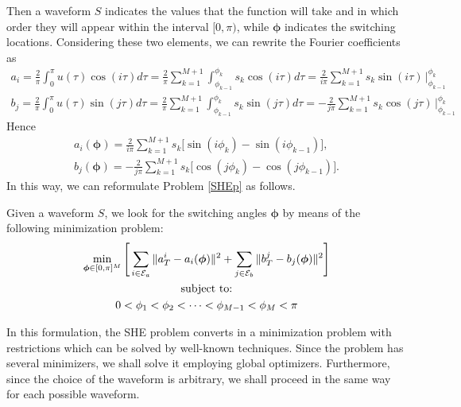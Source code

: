 Then a waveform $S$ indicates the values that the function will take and in which order they will appear within the interval $[0,\pi) $, while $\bm{\phi}$ indicates the switching locations. Considering these two elements, we can rewrite the Fourier coefficients as
\begin{gather}
    a_i = \frac{2}{\pi} \int_0^\pi u(\tau) \cos(i \tau)d\tau  = \frac{2}{\pi} \sum_{k=1}^{M+1} 
    \int_{\phi_{k-1}}^{\phi_{k}} s_k \cos(i\tau)d\tau = \frac{2}{i\pi} \sum_{k=1}^{M+1} s_k \sin(i\tau)\,\Big|_{\phi_{k-1}}^{\phi_k} 
\end{gather}
\begin{gather}
    b_j = \frac{2}{\pi} \int_0^\pi u(\tau ) \sin(j \tau)d\tau = \frac{2}{\pi} \sum_{k =1}^{M+1} \int_{\phi_{k-1}}^{\phi_{k}} s_k \sin(j\tau)d\tau = 
    -\frac{2}{j\pi} \sum_{k=1}^{M+1} s_k \cos(j\tau)\, \Big|_{\phi_{k-1}}^{\phi_k} 
\end{gather}
Hence
\begin{gather}
    a_i(\bm{\phi}) = \frac{2}{i\pi} \sum_{k=1}^{M+1} s_k \Big[\sin(i\phi_k) -\sin(i\phi_{k-1})\Big], 
    \\
    b_j(\bm{\phi}) = -\frac{2}{j\pi} \sum_{k=1}^{M+1} s_k \Big[\cos(j\phi_k) -\cos(j\phi_{k-1})\Big].
\end{gather}
In this way, we can reformulate Problem \ref{SHEp} as follows.
\begin{problem}
Given a waveform $S$, we look for the switching angles $\bm{\phi}$ by means of the following minimization problem:
\begin{gather} 
	\min_{\bm{\phi} \in [0,\pi]^{M}} \Bigg[\sum_{i\in\mathcal{E}_a} \|a_T^i - a_i(\bm{\phi})\|^2 + \sum_{j\in \mathcal{E}_b} \|b_T^j - b_j(\bm{\phi})\|^2 \Bigg]
    \\
    \notag \text{subject to:}
    \\
    0 <\phi_1 < \phi_2 < \dots < \phi_{M-1} < \phi_{M} < \pi  
\end{gather}
\end{problem}

In this formulation, the SHE problem converts in a minimization problem with restrictions which can be solved by well-known techniques. Since the problem has several minimizers, we shall solve it employing global optimizers. Furthermore, since the choice of the waveform is arbitrary, we shall proceed in the same way for each possible waveform. 